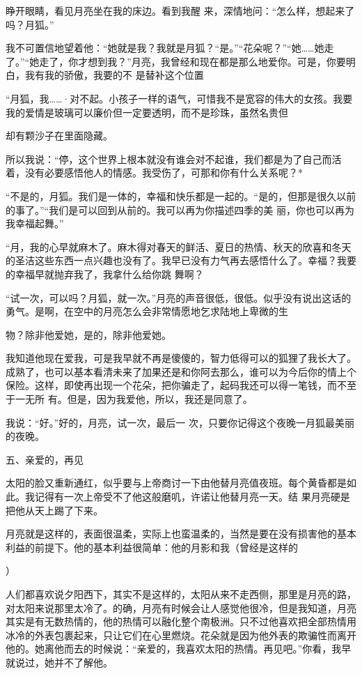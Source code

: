 \documentclass{article}
\begin{document}
睁开眼睛，看见月亮坐在我的床边。看到我醒
来，深情地问：“怎么样，想起来了吗？月狐。” 

我不可置信地望着他：“她就是我？我就是月狐？“是。”“花朵呢？”“她……她走了。”“她走了，你才想到我？”月亮，我曾经和现在都是那么地爱你。可是，你要明白，我有我的骄傲，我要的不
是替补这个位置 

“月狐，我……·对不起。小孩子一样的语气，可惜我不是宽容的伟大的女孩。我要我的爱情是玻璃可以廉价但一定要透明，而不是珍珠，虽然名贵但
\newpage

却有颗沙子在里面隐藏。 

所以我说：“停，这个世界上根本就没有谁会对不起谁，我们都是为了自己而活着，没有必要感悟他人的情感。我受伤了，可那和你有什么关系呢？*

“不是的，月狐。我们是一体的，幸福和快乐都是一起的。“是的，但那是很久以前的事了。”“我们是可以回到从前的。我可以再为你描述四季的美
丽，你也可以再为我幸福起舞。” 

“月，我的心早就麻木了。麻木得对春天的鲜活、夏日的热情、秋天的欣喜和冬天的圣洁这些东西一点兴趣也没有了。我早已没有力气再去感悟什么了。幸福？我要的幸福早就抛弃我了，我拿什么给你跳
舞啊？ 

“试一次，可以吗？月狐，就一次。”月亮的声音很低，很低。似乎没有说出这话的勇气。是啊，在空中的月亮怎么会非常情愿地乞求陆地上卑微的生

\newpage
物？除非他爱她，是的，除非他爱她。 

我知道他现在爱我，可是我早就不再是傻傻的，智力低得可以的狐狸了我长大了。成熟了，也可以基本看清未来了加果还是和你阿去那么，谁可以为今后你的情上个保险。这样，即使再出现一个花朵，把你骗走了，起码我还可以得一笔钱，而不至于一无所
有。但是，因为我爱他，所以，我还是同意了。 

我说：“好。”好的，月亮，试一次，最后一
次，只要你记得这个夜晚一月狐最美丽的夜晚。 


五、亲爱的，再见 

太阳的脸又重新通红，似乎要与上帝商讨一下由他替月亮值夜班。每个黄昏都是如此。我记得有一次上帝受不了他这般磨叽，许诺让他替月亮一天。结
果月亮硬是把他从天上踢了下来。 

月亮就是这样的，表面很温柔，实际上也蛮温柔的，当然是要在没有损害他的基本利益的前提下。他的基本利益很简单：他的月影和我（曾经是这样的
\newpage

） 

人们都喜欢说夕阳西下，其实不是这样的，太阳从来不走西侧，那里是月亮的路，对太阳来说那里太冷了。的确，月亮有时候会让人感觉他很冷，但是我知道，月亮其实是有无数热情的，他的热情可以融化整个南极洲。只不过他喜欢把全部热情用冰冷的外表包裹起来，只让它们在心里燃烧。花朵就是因为他外表的欺骗性而离开他的。她离他而去的时候说：“亲爱的，我喜欢太阳的热情。再见吧。”你看，我早
就说过，她并不了解他。 
\end{document}
